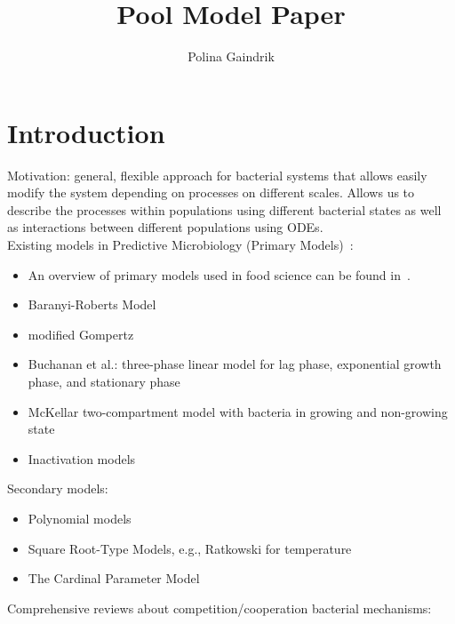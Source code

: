 \documentclass[10pt,A4paper]{article}
\title{Pool Model Paper}
\author{Polina Gaindrik}
\begin{document}
\maketitle

\tableofcontents

\newpage
%
%
%
%
\section{Introduction}
Motivation: general, flexible approach for bacterial systems that allows easily modify the system depending on processes on different scales.
Allows us to describe the processes within populations using different bacterial states as well as interactions between different populations using ODEs.\\
%
%
Existing models in Predictive Microbiology (Primary Models)~\cite{perez-rodriguez_predictive_2012}:
\begin{itemize}
    \item An overview of primary models used in food science can be found in~\cite{van_boekel_kinetic_2008}.
    \item Baranyi-Roberts Model~\cite{baranyi_modeling_1993, baranyi_dynamic_1994}
    \item modified Gompertz
    \item Buchanan et al.: three-phase linear model for lag phase, exponential growth phase, and stationary phase~\cite{buchanan_when_1997}
    \item McKellar two-compartment model with bacteria in growing and non-growing state~\cite{mckellar_heterogeneous_1997}
    \item Inactivation models
\end{itemize}
%
Secondary models:
\begin{itemize}
    \item Polynomial models 
    \item Square Root-Type Models, e.g., Ratkowski for temperature~\cite{ratkowsky_relationship_1982}
    \item The Cardinal Parameter Model~\cite{zwietering_decision_1992}
\end{itemize}
%
%
Comprehensive reviews about competition/cooperation bacterial mechanisms: \cite{ghoul_ecology_2016, stubbendieck_bacterial_2016, hibbing_bacterial_2010, west_social_2007}\\
%
%
\end{document}
